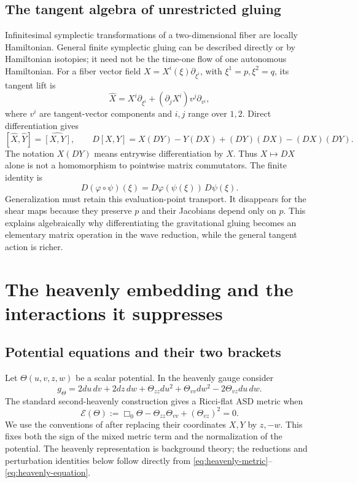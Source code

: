 \documentclass[11pt]{article}
\numberwithin{equation}{section}
\theoremstyle{definition}
\theoremstyle{remark}
\begin{document}
\subsection{The tangent algebra of unrestricted gluing}

Infinitesimal symplectic transformations of a two-dimensional fiber are locally Hamiltonian. General finite symplectic gluing can be described directly or by Hamiltonian isotopies; it need not be the time-one flow of one autonomous Hamiltonian. For a fiber vector field $X=X^i(\xi)\partial_{\xi^i}$, with $\xi^1=p,\xi^2=q$, its tangent lift is
\begin{equation}\label{eq:tangent-lift}
\widehat X=X^i\partial_{\xi^i}+(\partial_jX^i)v^j\partial_{v^i},
\end{equation}
where $v^i$ are tangent-vector components and $i,j$ range over $1,2$. Direct differentiation gives
\begin{equation}\label{eq:tangent-algebra}
[\widehat X,\widehat Y]=\widehat{[X,Y]},
\qquad
D[X,Y]=X(DY)-Y(DX)+(DY)(DX)-(DX)(DY).
\end{equation}
The notation $X(DY)$ means entrywise differentiation by $X$. Thus $X\mapsto DX$ alone is not a homomorphism to pointwise matrix commutators. The finite identity is
\begin{equation}\label{eq:chain-rule}
D(\varphi\circ\psi)(\xi)=D\varphi(\psi(\xi))\,D\psi(\xi).
\end{equation}
Generalization must retain this evaluation-point transport. It disappears for the shear maps because they preserve $p$ and their Jacobians depend only on $p$. This explains algebraically why differentiating the gravitational gluing becomes an elementary matrix operation in the wave reduction, while the general tangent action is richer.
\section{The heavenly embedding and the interactions it suppresses}\label{sec:heavenly}

\subsection{Potential equations and their two brackets}

Let $\Theta(u,v,z,w)$ be a scalar potential. In the heavenly gauge consider
\begin{equation}\label{eq:heavenly-metric}
g_\Theta=2du\,dv+2dz\,dw
+\Theta_{zz}du^2+\Theta_{vv}dw^2-2\Theta_{vz}du\,dw.
\end{equation}
The standard second-heavenly construction gives a Ricci-flat ASD metric when
\begin{equation}\label{eq:heavenly-equation}
\mathcal E(\Theta):=\Box_0\Theta-\Theta_{zz}\Theta_{vv}
+(\Theta_{vz})^2=0.
\end{equation}
We use the conventions of \cite[Section~2]{BGS} after replacing their coordinates $X,Y$ by $z,-w$. This fixes both the sign of the mixed metric term and the normalization of the potential. The heavenly representation is background theory; the reductions and perturbation identities below follow directly from \eqref{eq:heavenly-metric}--\eqref{eq:heavenly-equation}.
\end{document}
